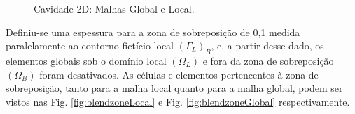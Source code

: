 \documentclass[tese_patricia]{subfiles}
\begin{document}
\begin{figure}[!htb]
	\centering
	\caption{Cavidade 2D: Malhas Global e Local.}
	\label{fig:CavOverlap}
\end{figure}

Definiu-se uma espessura para a zona de sobreposição de 0,1 medida paralelamente ao contorno fictício local $(\Gamma_{L})_{B}$, e, a partir desse dado, os elementos globais sob o domínio local $(\Omega_{L})$ e fora da zona de sobreposição $(\Omega_{B})$ foram desativados. As células e elementos pertencentes à zona de sobreposição, tanto para a malha local quanto para a malha global, podem ser vistos nas Fig. \ref{fig:blendzoneLocal} e Fig. \ref{fig:blendzoneGlobal} respectivamente.
\end{document}
